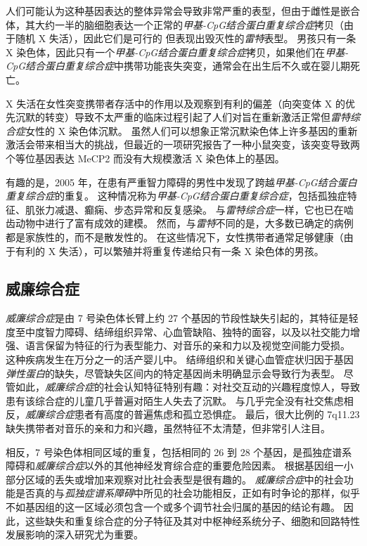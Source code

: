 人们可能认为这种基因表达的整体异常会导致非常严重的表型，但由于雌性是嵌合体，其大约一半的脑细胞表达一个正常的\textit{甲基-CpG结合蛋白重复综合症}拷贝（由于随机 X 失活），因此它们是可行的 但表现出毁灭性的\textit{雷特}表型。
男孩只有一条 X 染色体，因此只有一个\textit{甲基-CpG结合蛋白重复综合症}拷贝，如果他们在\textit{甲基-CpG结合蛋白重复综合症}中携带功能丧失突变，通常会在出生后不久或在婴儿期死亡。


X 失活在女性突变携带者存活中的作用以及观察到有利的偏差（向突变体 X 的优先沉默的转变）导致不太严重的临床过程引起了人们对旨在重新激活正常但\textit{雷特综合症}女性的 X 染色体沉默。
虽然人们可以想象正常沉默染色体上许多基因的重新激活会带来相当大的挑战，但最近的一项研究报告了一种小鼠突变，该突变导致两个等位基因表达 MeCP2 而没有大规模激活 X 染色体上的基因。


有趣的是，2005 年，在患有严重智力障碍的男性中发现了跨越\textit{甲基-CpG结合蛋白重复综合症}的重复。
这种情况称为\textit{甲基-CpG结合蛋白重复综合症}，包括孤独症特征、肌张力减退、癫痫、步态异常和反复感染。
与\textit{雷特综合症}一样，它也已在啮齿动物中进行了富有成效的建模。
然而，与\textit{雷特}不同的是，大多数已确定的病例都是家族性的，而不是散发性的。
在这些情况下，女性携带者通常足够健康（由于有利的 X 失活），可以繁殖并将重复传递给只有一条 X 染色体的男孩。



\subsection{威廉综合症}

\textit{威廉综合症}是由 7 号染色体长臂上约 27 个基因的节段性缺失引起的，其特征是轻度至中度智力障碍、结缔组织异常、心血管缺陷、独特的面容，以及以社交能力增强、语言保留为特征的行为表型能力、对音乐的亲和力以及视觉空间能力受损。
这种疾病发生在万分之一的活产婴儿中。
结缔组织和关键心血管症状归因于基因\textit{弹性蛋白}的缺失，尽管缺失区间内的特定基因尚未明确显示会导致行为表型。
尽管如此，\textit{威廉综合症}的社会认知特征特别有趣：对社交互动的兴趣程度惊人，导致患有该综合症的儿童几乎普遍对陌生人失去了沉默。
与几乎完全没有社交焦虑相反，\textit{威廉综合症}患者有高度的普遍焦虑和孤立恐惧症。
最后，很大比例的 7q11.23 缺失携带者对音乐的亲和力和兴趣，虽然特征不太清楚，但非常引人注目。


相反，7 号染色体相同区域的重复，包括相同的 26 到 28 个基因，是孤独症谱系障碍和\textit{威廉综合症}以外的其他神经发育综合症的重要危险因素。
根据基因组一小部分区域的丢失或增加来观察对比社会表型是很有趣的。
\textit{威廉综合症}中的社会功能是否真的与\textit{孤独症谱系障碍}中所见的社会功能相反，正如有时争论的那样，似乎不如基因组的这一区域必须包含一个或多个调节社会归属的基因的结论有趣。
因此，这些缺失和重复综合症的分子特征及其对中枢神经系统分子、细胞和回路特性发展影响的深入研究尤为重要。



